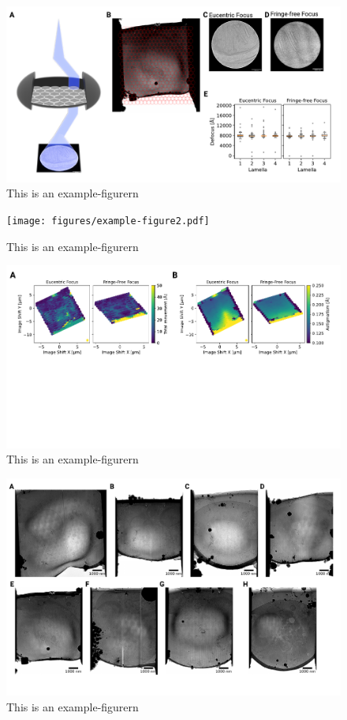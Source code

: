 \documentclass[
]{article}
\begin{document}
\begin{figure}
\hypertarget{fig:approach}{%
\centering
\includegraphics{figures/example-figure.pdf}
\caption{This is an example-figurern}\label{fig:approach}
}
\end{figure}

\begin{figure}
\hypertarget{fig:approach2}{%
\centering
\texttt{[image: figures/example-figure2.pdf]}
\caption{This is an example-figurern}\label{fig:approach2}
}
\end{figure}

\begin{figure}
\hypertarget{fig:approach3}{%
\centering
\includegraphics{figures/example-figure3.pdf}
\caption{This is an example-figurern}\label{fig:approach3}
}
\end{figure}

\begin{figure}
\hypertarget{fig:approach4}{%
\centering
\includegraphics{figures/example-figure4.pdf}
\caption{This is an example-figurern}\label{fig:approach4}
}
\end{figure}
\end{document}
